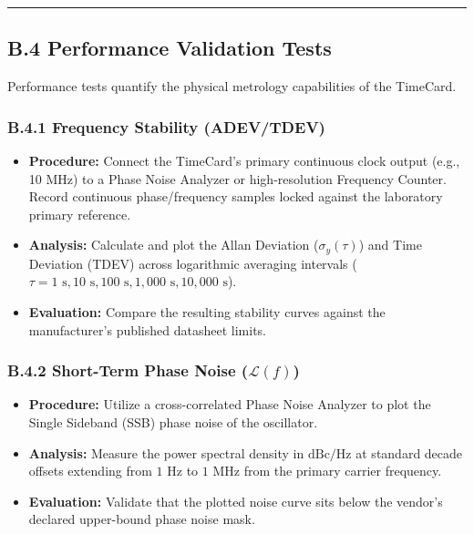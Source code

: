 \begin{center}\rule{0.5\linewidth}{0.5pt}\end{center}

\subsection{B.4 Performance Validation
Tests}\label{b.4-performance-validation-tests}

Performance tests quantify the physical metrology capabilities of the
TimeCard.

\subsubsection{B.4.1 Frequency Stability
(ADEV/TDEV)}\label{b.4.1-frequency-stability-adevtdev}

\begin{itemize}
\tightlist
\item
  \textbf{Procedure:} Connect the TimeCard's primary continuous clock
  output (e.g., 10 MHz) to a Phase Noise Analyzer or high-resolution
  Frequency Counter. Record continuous phase/frequency samples locked
  against the laboratory primary reference.
\item
  \textbf{Analysis:} Calculate and plot the Allan Deviation
  (\(\sigma_y(\tau)\)) and Time Deviation (TDEV) across logarithmic
  averaging intervals
  (\(\tau = 1\text{ s}, 10\text{ s}, 100\text{ s}, 1,\!000\text{ s}, 10,\!000\text{ s}\)).
\item
  \textbf{Evaluation:} Compare the resulting stability curves against
  the manufacturer's published datasheet limits.
\end{itemize}

\subsubsection{\texorpdfstring{B.4.2 Short-Term Phase Noise
(\(\mathcal{L}(f)\))}{B.4.2 Short-Term Phase Noise (\textbackslash mathcal\{L\}(f))}}\label{b.4.2-short-term-phase-noise-mathcallf}

\begin{itemize}
\tightlist
\item
  \textbf{Procedure:} Utilize a cross-correlated Phase Noise Analyzer to
  plot the Single Sideband (SSB) phase noise of the oscillator.
\item
  \textbf{Analysis:} Measure the power spectral density in
  \(\text{dBc/Hz}\) at standard decade offsets extending from
  \(1\text{ Hz}\) to \(1\text{ MHz}\) from the primary carrier
  frequency.
\item
  \textbf{Evaluation:} Validate that the plotted noise curve sits below
  the vendor's declared upper-bound phase noise mask.
\end{itemize}

